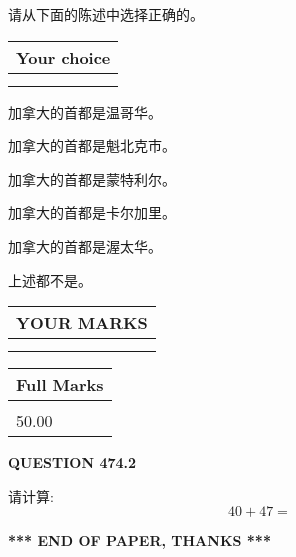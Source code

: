 \documentclass{ctexart}
\begin{document}
  
请从下面的陈述中选择正确的。
  
  
\noindent\hspace{3.0in} \begin{tabular}{|l|}
\hline
Your choice \\
\hline
 \\ 
 \\ 
\hline
\end{tabular}
  
  
 
 
加拿大的首都是温哥华。
 
 
加拿大的首都是魁北克市。
 
 
加拿大的首都是蒙特利尔。
 
 
加拿大的首都是卡尔加里。
 
 
加拿大的首都是渥太华。
 
 
 上述都不是。
 
 
  
\vspace{0.2in}
  
\noindent\begin{tabular}{|l|}
\hline
 YOUR MARKS  \\
\hline
 \\ 
 \\ 
\hline
\end{tabular}
\hspace{0.05in} \begin{tabular}{|l|}
\hline
 Full Marks  \\
\hline
 \\ 
50.00 \\
\hline
\end{tabular}
{\textbf{\Large{QUESTION
474.2 
}}}
  
  
 
请计算:
\begin{equation}
40 +  %
47 = \nonumber
\end{equation}
 

 

 
   
   
 \vspace{0.2in}
 
   
   
   
   
\vspace{1.0in} 
{\textbf{\large{ *** END OF PAPER, THANKS *** }}} 
   
\end{document}
